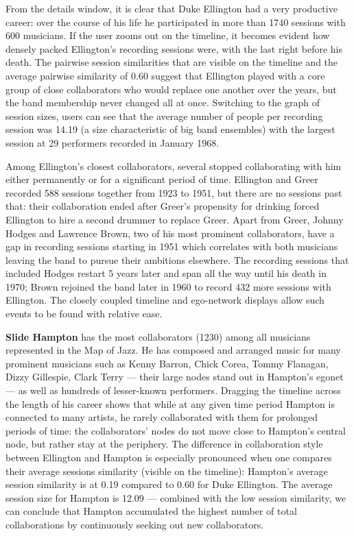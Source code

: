 \documentclass[12pt]{cmuthesis}
\begin{document}

  From the details window, it is clear that Duke Ellington had a very productive career: over the course of his life he participated in more than 1740 sessions with 600 musicians. If the user zooms out on the timeline, it becomes evident how densely packed Ellington's recording sessions were, with the last right before his death. The pairwise session similarities that are visible on the timeline and the average pairwise similarity of 0.60 suggest that Ellington played with a core group of close collaborators who would replace one another over the years, but the band membership never changed all at once. Switching to the graph of session sizes, users can see that the average number of people per recording session was 14.19 (a size characteristic of big band ensembles) with the largest session at 29 performers recorded in January 1968.

  

  Among Ellington's closest collaborators, several stopped collaborating with him either permanently or for a significant period of time. Ellington and Greer recorded 588 sessions together from 1923 to 1951, but there are no sessions past that: their collaboration ended after Greer's propensity for drinking forced Ellington to hire a second drummer to replace Greer. Apart from Greer, Johnny Hodges and Lawrence Brown, two of his most prominent collaborators, have a gap in recording sessions starting in 1951 which correlates with both musicians leaving the band to pursue their ambitions elsewhere. The recording sessions that included Hodges restart 5 years later and span all the way until his death in 1970; Brown rejoined the band later in 1960 to record 432 more sessions with Ellington.  The closely coupled timeline and ego-network displays allow such events to be found with relative ease.

  \textbf{Slide Hampton} has the most collaborators (1230) among all musicians represented in the Map of Jazz. He has composed and arranged music for many prominent musicians such as Kenny Barron, Chick Corea, Tommy Flanagan, Dizzy Gillespie, Clark Terry --- their large nodes stand out in Hampton's egonet --- as well as hundreds of lesser-known performers. Dragging the timeline across the length of his career shows that while at any given time period Hampton is connected to many artists, he rarely collaborated with them for prolonged periods of time: the collaborators' nodes do not move close to Hampton's central node, but rather stay at the periphery. The difference in collaboration style between Ellington and Hampton is especially pronounced when one compares their average sessions similarity (visible on the timeline): Hampton's average session similarity is at 0.19 compared to 0.60 for Duke Ellington. The average session size for Hampton is 12.09 --- combined with the low session similarity, we can conclude that Hampton accumulated the highest number of total collaborations by continuously seeking out new collaborators.
\end{document}
